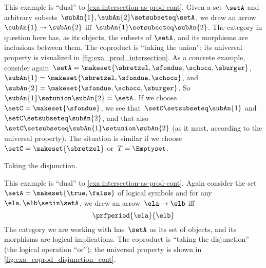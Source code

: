 \begin{example}
    \label{exa:union-as-coprod-cont}
    This example is ``dual'' to \cref{exa:intersection-as-prod-cont}.
    Given a set~$\setA$ and arbitrary subsets~$\subAn{1}, \subAn{2} \setsubseteq \setA$, we drew an arrow~$\subAn{1} \to \subAn{2}$ iff~$\subAn{1} \setsubseteq \subAn{2}$.
    The category in question here has, as its objects, the subsets of $\setA$, and its morphisms are inclusions between them.
    The coproduct is ``taking the union''; its universal property is visualized in \cref{fig:exa_prod_intersection}.
    As a concrete example, consider again~$\setA = \makeset{ \sbretzel, \sfondue, \schoco, \sburger }$,~$\subAn{1} = \makeset{ \sbretzel, \sfondue, \schoco }$, and~$\subAn{2} = \makeset{\sfondue, \schoco, \sburger }$.
    So~$\subAn{1} \setunion \subAn{2} = \setA$.
    If we choose~$\setC = \makeset{ \sfondue }$, we see that~$\setC \setsubseteq \subAn{1}$ and~$\setC \setsubseteq \subAn{2}$, and that also~$\setC \setsubseteq \subAn{1} \setunion \subAn{2}$ (as it must, according to the universal property).
    The situation is similar if we choose~$\setC = \makeset{ \sbretzel }$ or~$T = \Emptyset$.
\end{example}

\begin{marginfigure}
    \centering
    \caption{Taking the disjunction.}
    \label{fig:exa_coprod_disjunction_cont}
\end{marginfigure}

\begin{example}
    \label{exa:disjunction-as-coprod-cont}
    This example is ``dual'' to \cref{exa:intersection-as-prod-cont}.
    Again consider the set~$\setA = \makeset{ \true, \false }$ of logical symbols and for any~$\ela, \elb  \setin \setA$, we drew an arrow~$\ela \to \elb$ iff
    \begin{equation}
        \prfperiod{\ela}{\elb}
    \end{equation}
    The category we are working with has~$\setA$ as its set of objects, and its morphisms are logical implications.
    The coproduct is ``taking the disjunction'' (the logical operation ``or''); the universal property is shown in \cref{fig:exa_coprod_disjunction_cont}.
\end{example}


